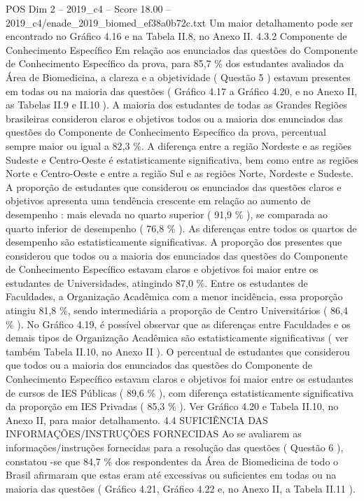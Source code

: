 \begin{textsample}{POS Dim 2 – 2019\_c4 – Score 18.00 – 2019\_c4/enade\_2019\_biomed\_ef38a0b72c.txt}
Um maior detalhamento pode ser encontrado no Gráfico 4.16 e na Tabela II.8, no Anexo II. 4.3.2 Componente de Conhecimento Específico Em relação aos enunciados das questões do Componente de Conhecimento Específico da prova, para 85,7 \% dos estudantes avaliados da Área de Biomedicina, a clareza e a objetividade ( Questão 5 ) estavam presentes em todas ou na maioria das questões ( Gráfico 4.17 a Gráfico 4.20, e no Anexo II, as Tabelas II.9 e II.10 ).
A maioria dos estudantes de todas as Grandes Regiões brasileiras considerou claros e objetivos todos ou a maioria dos enunciados das questões do Componente de Conhecimento Específico da prova, percentual sempre maior ou igual a 82,3 \%.
A diferença entre a região Nordeste e as regiões Sudeste e Centro-Oeste é estatisticamente significativa, bem como entre as regiões Norte e Centro-Oeste e entre a região Sul e as regiões Norte, Nordeste e Sudeste.
A proporção de estudantes que considerou os enunciados das questões claros e objetivos apresenta uma tendência crescente em relação ao aumento de desempenho : mais elevada no quarto superior ( 91,9 \% ), se comparada ao quarto inferior de desempenho ( 76,8 \% ).
As diferenças entre todos os quartos de desempenho são estatisticamente significativas.
A proporção dos presentes que considerou que todos ou a maioria dos enunciados das questões do Componente de Conhecimento Específico estavam claros e objetivos foi maior entre os estudantes de Universidades, atingindo 87,0 \%.
Entre os estudantes de Faculdades, a Organização Acadêmica com a menor incidência, essa proporção atingiu 81,8 \%, sendo intermediária a proporção de Centro Universitários ( 86,4 \% ).
No Gráfico 4.19, é possível observar que as diferenças entre Faculdades e os demais tipos de Organização Acadêmica são estatisticamente significativas ( ver também Tabela II.10, no Anexo II ).
O percentual de estudantes que considerou que todos ou a maioria dos enunciados das questões do Componente de Conhecimento Específico estavam claros e objetivos foi maior entre os estudantes de cursos de IES Públicas ( 89,6 \% ), com diferença estatisticamente significativa da proporção em IES Privadas ( 85,3 \% ).
Ver Gráfico 4.20 e Tabela II.10, no Anexo II, para maior detalhamento. 4.4 SUFICIÊNCIA DAS INFORMAÇÕES/INSTRUÇÕES FORNECIDAS Ao se avaliarem as informações/instruções fornecidas para a resolução das questões ( Questão 6 ), constatou -se que 84,7 \% dos respondentes da Área de Biomedicina de todo o Brasil afirmaram que estas eram até excessivas ou suficientes em todas ou na maioria das questões ( Gráfico 4.21, Gráfico 4.22 e, no Anexo II, a Tabela II.11 ).

\end{textsample}
